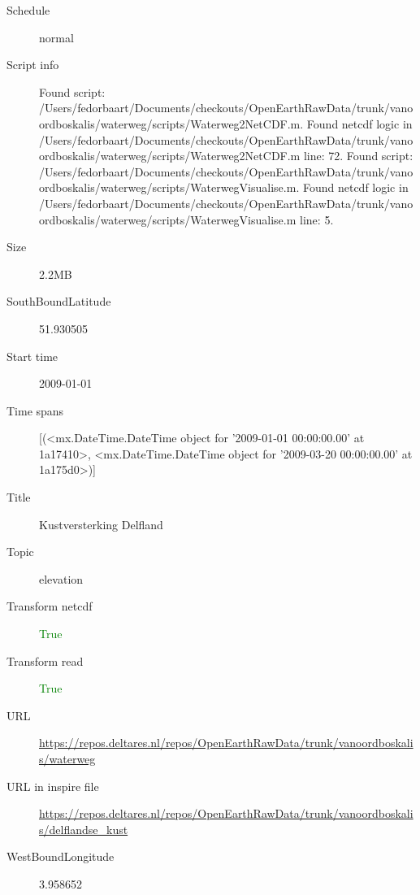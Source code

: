\documentclass[9]{report}
\begin{document}
\begin{description}
\begin{verbatim}
\end{verbatim}
  \item[Schedule] normal
  \item[Script info] Found script: /Users/fedorbaart/Documents/checkouts/OpenEarthRawData/trunk/vanoordboskalis/waterweg/scripts/Waterweg2NetCDF.m.
Found netcdf logic in /Users/fedorbaart/Documents/checkouts/OpenEarthRawData/trunk/vanoordboskalis/waterweg/scripts/Waterweg2NetCDF.m line: 72.
Found script: /Users/fedorbaart/Documents/checkouts/OpenEarthRawData/trunk/vanoordboskalis/waterweg/scripts/WaterwegVisualise.m.
Found netcdf logic in /Users/fedorbaart/Documents/checkouts/OpenEarthRawData/trunk/vanoordboskalis/waterweg/scripts/WaterwegVisualise.m line: 5.
  \item[Size] 2.2MB
  \item[SouthBoundLatitude] 51.930505
  \item[Start time] 2009-01-01
  \item[Time spans] [(<mx.DateTime.DateTime object for '2009-01-01 00:00:00.00' at 1a17410>, <mx.DateTime.DateTime object for '2009-03-20 00:00:00.00' at 1a175d0>)]
  \item[Title]  Kustversterking Delfland 
  \item[Topic] elevation
  \item[Transform netcdf] \textcolor{green}{True}
  \item[Transform read] \textcolor{green}{True}
  \item[URL] \href{https://repos.deltares.nl/repos/OpenEarthRawData/trunk/vanoordboskalis/waterweg}{https://repos.deltares.nl/repos/OpenEarthRawData/trunk/vanoordboskalis/waterweg}
  \item[URL in inspire file] \href{https://repos.deltares.nl/repos/OpenEarthRawData/trunk/vanoordboskalis/delflandse\_kust}{https://repos.deltares.nl/repos/OpenEarthRawData/trunk/vanoordboskalis/delflandse\_kust}
  \item[WestBoundLongitude] 3.958652
\end{description}
\end{document}
